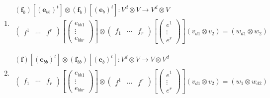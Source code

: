 \documentclass[aps,preprint]{revtex4}
\begin{document}
\begin{enumerate}
\begin{enumerate}
\item 
\begin{gather}
\left( \boldsymbol{f}_{b}\right) \left[ \left( \mathbf{e}_{bb}\right) ^{t}%
\right] \otimes \left( \boldsymbol{f}_{b}\right) \left[ \left( \mathbf{e}%
_{b}\right) ^{t}\right] :V^{d}\otimes V\rightarrow V^{d}\otimes V \\
\left( 
\begin{array}{ccc}
f^{1} & \cdots & f^{r}%
\end{array}%
\right) \left[ \left( 
\begin{array}{c}
e_{bb1} \\ 
\vdots \\ 
e_{bbr}%
\end{array}%
\right) \right] \otimes \left( 
\begin{array}{ccc}
f_{1} & \cdots & f_{r}%
\end{array}%
\right) \left[ \left( 
\begin{array}{c}
e^{1} \\ 
\vdots \\ 
e^{r}%
\end{array}%
\right) \right] \left( v_{d1}\otimes v_{2}\right) =\left( w_{d1}\otimes
w_{2}\right)
\end{gather}

\item 
\begin{gather}
\left( \boldsymbol{f}\right) \left[ \left( \mathbf{e}_{bb}\right) ^{t}\right]
\otimes \left( \boldsymbol{f}_{bb}\right) \left[ \left( \mathbf{e}%
_{b}\right) ^{t}\right] :V^{d}\otimes V\rightarrow V\otimes V^{d} \\
\left( 
\begin{array}{ccc}
f_{1} & \cdots & f_{r}%
\end{array}%
\right) \left[ \left( 
\begin{array}{c}
e_{bb1} \\ 
\vdots \\ 
e_{bbr}%
\end{array}%
\right) \right] \otimes \left( 
\begin{array}{ccc}
f^{1} & \cdots & f^{r}%
\end{array}%
\right) \left[ \left( 
\begin{array}{c}
e^{1} \\ 
\vdots \\ 
e^{r}%
\end{array}%
\right) \right] \left( v_{d1}\otimes v_{2}\right) =\left( w_{1}\otimes
w_{d2}\right)
\end{gather}


\end{enumerate}
\end{enumerate}
\end{document}
